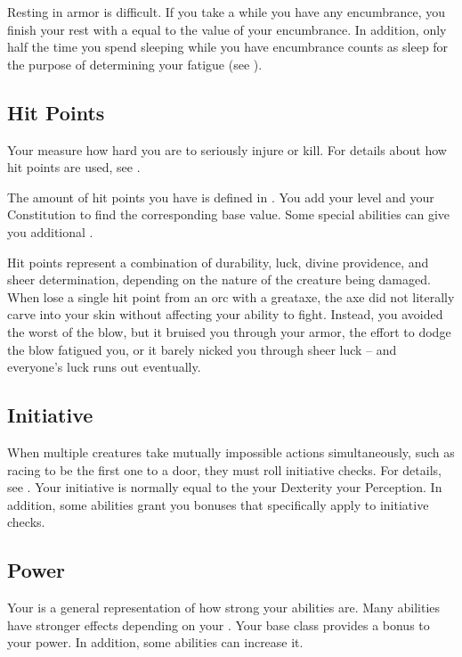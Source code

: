         Resting in armor is difficult.
        If you take a  while you have any encumbrance, you finish your rest with a  equal to the value of your encumbrance.
        In addition, only half the time you spend sleeping while you have encumbrance counts as sleep for the purpose of determining your fatigue (see ).

    \subsection{Hit Points}\label{Hit Points}
        Your  measure how hard you are to seriously injure or kill.
        For details about how hit points are used, see .

        The amount of hit points you have is defined in .
        You add your level and your Constitution to find the corresponding base value.
        Some special abilities can give you additional .

         Hit points represent a combination of durability, luck, divine providence, and sheer determination, depending on the nature of the creature being damaged.
        When lose a single hit point from an orc with a greataxe, the axe did not literally carve into your skin without affecting your ability to fight.
        Instead, you avoided the worst of the blow, but it bruised you through your armor, the effort to dodge the blow fatigued you, or it barely nicked you through sheer luck -- and everyone's luck runs out eventually.

    \subsection{Initiative}\label{Initiative}
        When multiple creatures take mutually impossible actions simultaneously, such as racing to be the first one to a door, they must roll initiative checks.
        For details, see .
        Your initiative is normally equal to the your Dexterity \add your Perception.
        In addition, some abilities grant you bonuses that specifically apply to initiative checks.

    \subsection{Power}\label{Power}
        Your  is a general representation of how strong your abilities are.
        Many abilities have stronger effects depending on your .
        Your base class provides a bonus to your power.
        In addition, some abilities can increase it.

